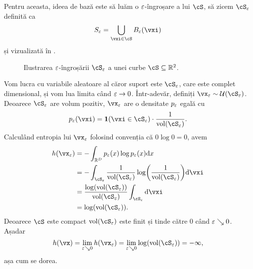 \documentclass[../../book-main_ro.tex]{subfiles}
\begin{document}
Pentru aceasta, ideea de bază este să luăm o \(\varepsilon\)-îngroșare a lui \(\cS\), să zicem \(\cS_{\eps}\) definită ca 
\begin{equation}
    S_{\eps} = \bigcup_{\vxi \in \cS}B_{\eps}(\vxi)
\end{equation}
și vizualizată în .
\begin{figure}[th]
    \centering
    \caption{Ilustrarea \(\varepsilon\)-îngroșării \(\cS_\eps\) a unei curbe \(\cS \subseteq \R^{2}\).}
    \label{fig:entropy_eps_thickening}
\end{figure}
Vom lucra cu variabile aleatoare al căror suport este \(\cS_{\eps}\), care este complet dimensional, și vom lua limita când \(\varepsilon \to 0\). Într-adevăr, definiți \(\vx_{\eps} \sim \dUnif(\cS_{\eps})\). Deoarece \(\cS_{\eps}\) are volum pozitiv, \(\vx_{\eps}\) are o densitate \(p_{\varepsilon}\) egală cu
\begin{equation}
    p_{\eps}(\vxi) = \indvar(\vxi \in \cS_{\eps}) \cdot \frac{1}{\volume(\cS_{\eps})}.
\end{equation}
Calculând entropia lui \(\vx_{\eps}\) folosind convenția că \(0 \log 0 = 0\), avem
\begin{align}
    h(\vx_{\eps}) 
    &= -\int_{\R^{D}}p_{\eps}(x)\log p_{\eps}(x)\odif{x} \\ 
    &= -\int_{\cS_{\eps}}\frac{1}{\volume(\cS_{\eps})} \log\rp{\frac{1}{\volume(\cS_{\eps})}}\odif{\vxi} \\ 
    &= \frac{\log(\volume(\cS_{\eps}))}{\volume(\cS_{\eps})}\int_{\cS_{\eps}}\odif{\vxi} \\ 
    &= \log(\volume(\cS_{\eps})).
\end{align}
Deoarece \(\cS\) este compact \(\volume(\cS_{\eps})\) este finit și tinde către \(0\) când \(\varepsilon \searrow 0\). Așadar
\begin{equation}
    h(\vx) = \lim_{\eps \searrow 0}h(\vx_{\eps}) = \lim_{\eps \searrow 0}\log(\volume(\cS_{\eps})) = -\infty,
\end{equation}
așa cum se dorea.
\end{document}
